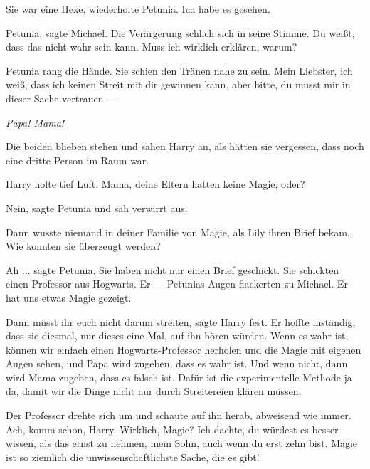 \glqq{}Sie war eine Hexe\grqq{}, wiederholte Petunia. \glqq{}Ich habe es
gesehen.\grqq{}

\glqq{}Petunia\grqq{}, sagte Michael. Die Verärgerung schlich sich in seine
Stimme. \glqq{}Du weißt, dass das nicht wahr sein kann. Muss ich wirklich
erklären, warum?\grqq{}

Petunia rang die Hände. Sie schien den Tränen nahe zu sein. \glqq{}Mein
Liebster, ich weiß, dass ich keinen Streit mit dir gewinnen kann, aber bitte, du
musst mir in dieser Sache vertrauen ---\grqq{}

\glqq{}\emph{Papa! Mama!}\grqq{}

Die beiden blieben stehen und sahen Harry an, als hätten sie vergessen, dass
noch eine dritte Person im Raum war.

Harry holte tief Luft. \glqq{}Mama, deine Eltern hatten keine Magie, oder?\grqq{}

\glqq{}Nein\grqq{}, sagte Petunia und sah verwirrt aus.

\glqq{}Dann wusste niemand in deiner Familie von Magie, als Lily ihren Brief
bekam. Wie konnten sie überzeugt werden?\grqq{}

\glqq{}Ah ...\grqq{} sagte Petunia. \glqq{}Sie haben nicht nur einen Brief
geschickt. Sie schickten einen Professor aus Hogwarts. Er ---\grqq{} Petunias
Augen flackerten zu Michael. \glqq{}Er hat uns etwas Magie gezeigt.\grqq{}

\glqq{}Dann müsst ihr euch nicht darum streiten\grqq{}, sagte Harry fest. Er
hoffte inständig, dass sie diesmal, nur dieses eine Mal, auf ihn hören würden.
\glqq{}Wenn es wahr ist, können wir einfach einen Hogwarts-Professor herholen und
die Magie mit eigenen Augen sehen, und Papa wird zugeben, dass es wahr ist. Und
wenn nicht, dann wird Mama zugeben, dass es falsch ist. Dafür ist die
experimentelle Methode ja da, damit wir die Dinge nicht nur durch Streitereien
klären müssen.\grqq{}

Der Professor drehte sich um und schaute auf ihn herab, abweisend wie immer.
\glqq{}Ach, komm schon, Harry. Wirklich, Magie? Ich dachte, du würdest es besser
wissen, als das ernst zu nehmen, mein Sohn, auch wenn du erst zehn bist. Magie
ist so ziemlich die unwissenschaftlichste Sache, die es gibt!\grqq{}

